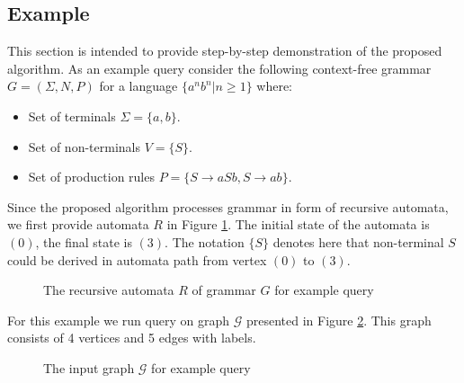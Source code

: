 \subsection{Example}

This section is intended to provide step-by-step demonstration of the proposed algorithm. As an example query consider the following context-free grammar $G=(\Sigma,N,P)$ for a language $\{a^n b^n | n \geq 1\}$ where:

\begin{itemize}
    \item Set of terminals $\Sigma = \{a, b\}$.
    \item Set of non-terminals $V = \{ S \}$.
    \item Set of production rules $P = \{ S \to a S b, S \to a b\}$.
\end{itemize}

Since the proposed algorithm processes grammar in form of recursive automata, we first provide automata $R$ in Figure \ref{input:automata}. The initial state of the automata is $(0)$, the final state is $(3)$. The notation $\{S\}$ denotes here that non-terminal $S$ could be derived in automata path from vertex $(0)$ to $(3)$.


\begin{figure}[h]
    \centering
    \caption{The recursive automata $R$ of grammar $G$ for example query}
    \label{input:automata}
\end{figure}

For this example we run query on graph $\mathcal{G}$ presented in Figure \ref{input:graph}. This graph consists of 4 vertices and 5 edges with labels.

\begin{figure}[h]
        \centering
        \caption{The input graph $\mathcal{G}$ for example query}
        \label{input:graph}
\end{figure}

